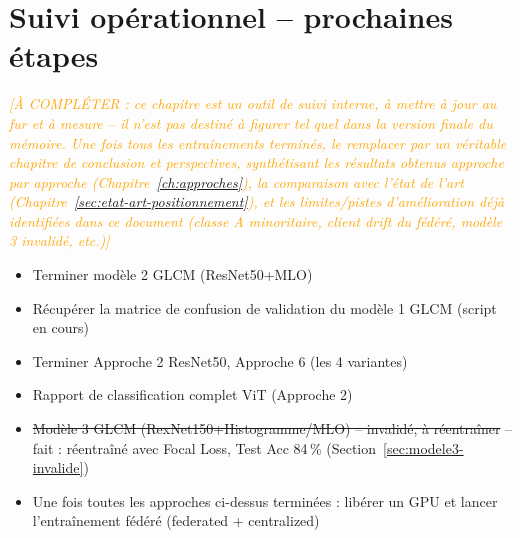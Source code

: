 \documentclass[12pt,a4paper]{report}
\newcommand{\todo}[1]{\textcolor{orange}{\textit{[À COMPLÉTER : #1]}}}
\begin{document}
\chapter{Suivi opérationnel -- prochaines étapes}
\todo{ce chapitre est un outil de suivi interne, à mettre à jour au fur et à
mesure -- il n'est pas destiné à figurer tel quel dans la version finale du
mémoire. Une fois tous les entraînements terminés, le remplacer par un
véritable chapitre de conclusion et perspectives, synthétisant les résultats
obtenus approche par approche (Chapitre~\ref{ch:approches}), la comparaison
avec l'état de l'art (Chapitre~\ref{sec:etat-art-positionnement}), et les
limites/pistes d'amélioration déjà
identifiées dans ce document (classe A minoritaire, client drift du fédéré,
modèle 3 invalidé, etc.)}
\begin{itemize}
  \item Terminer modèle 2 GLCM (ResNet50+MLO)
  \item Récupérer la matrice de confusion de validation du modèle 1 GLCM (script en cours)
  \item Terminer Approche 2 ResNet50, Approche 6 (les 4 variantes)
  \item Rapport de classification complet ViT (Approche 2)
  \item \sout{Modèle 3 GLCM (RexNet150+Histogramme/MLO) -- invalidé, à réentraîner}
    -- fait : réentraîné avec Focal Loss, Test Acc 84\,\% (Section~\ref{sec:modele3-invalide})
  \item Une fois toutes les approches ci-dessus terminées : libérer un GPU et
    lancer l'entraînement fédéré (federated + centralized)
\end{itemize}
\end{document}
